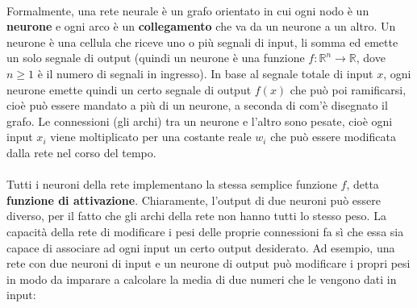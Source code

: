 \documentclass[12pt]{article}
\begin{document}
\paragraph{} Formalmente, una rete neurale è un grafo orientato in cui ogni nodo è un \textbf{neurone} e ogni arco è un \textbf{collegamento} che va da un neurone a un altro. Un neurone è una cellula che riceve uno o più segnali di input, li somma ed emette un solo segnale di output (quindi un neurone è una funzione $f : \mathbb{R}^n \rightarrow \mathbb{R}$, dove $n \ge 1$ è il numero di segnali in ingresso). In base al segnale totale di input $x$, ogni neurone emette quindi un certo segnale di output $f(x)$ che può poi ramificarsi, cioè può essere mandato a più di un neurone, a seconda di com'è disegnato il grafo. Le connessioni (gli archi) tra un neurone e l'altro sono pesate, cioè ogni input $x_i$ viene moltiplicato per una costante reale $w_i$ che può essere modificata dalla rete nel corso del tempo.

\paragraph{} Tutti i neuroni della rete implementano la stessa semplice funzione $f$, detta \textbf{funzione di attivazione}. Chiaramente, l'output di due neuroni può essere diverso, per il fatto che gli archi della rete non hanno tutti lo stesso peso. La capacità della rete di modificare i pesi delle proprie connessioni fa sì che essa sia capace di associare ad ogni input un certo output desiderato. Ad esempio, una rete con due neuroni di input e un neurone di output può modificare i propri pesi in modo da imparare a calcolare la media di due numeri che le vengono dati in input:

\begin{center}
\end{center}
\end{document}
